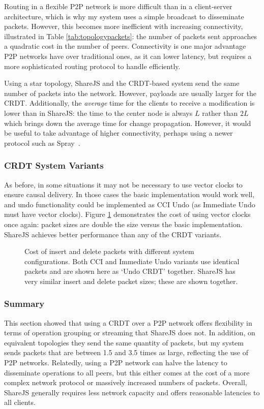 \documentclass[12pt,a4paper,twoside,openright]{report}
\begin{document}
			Routing in a flexible P2P network is more difficult than in a client-server architecture, which is why my system uses a simple broadcast to disseminate packets. However, this becomes more inefficient with increasing connectivity, illustrated in Table \ref{tab:topologypackets}: the number of packets sent approaches a quadratic cost in the number of peers. Connectivity is one major advantage P2P networks have over traditional ones, as it can lower latency, but requires a more sophisticated routing protocol to handle efficiently.
			

			Using a star topology, ShareJS and the CRDT-based system send the same number of packets into the network. However, payloads are usually larger for the CRDT. Additionally, the \textit{average} time for the clients to receive a modification is lower than in ShareJS: the time to the center node is always $L$ rather than $2L$ which brings down the average time for change propagation. However, it would be useful to take advantage of higher connectivity, perhaps using a newer protocol such as Spray~\cite{nedelec2015spray}.
			
			
		\subsubsection{CRDT System Variants}
			As before, in some situations it may not be necessary to use vector clocks to ensure causal delivery. In those cases the basic implementation would work well, and undo functionality could be implemented as CCI Undo (as Immediate Undo must have vector clocks). Figure \ref{fig:sysvariationspackets} demonstrates the cost of using vector clocks once again: packet sizes are double the size versus the basic implementation. ShareJS achieves better performance than any of the CRDT variants.
		
			\begin{figure}[H]
				\centering
				
				\caption[Behavior of System Variants - Packet Size] {Cost of insert and delete packets with different system configurations. Both CCI and Immediate Undo variants use identical packets and are shown here as `Undo CRDT' together. ShareJS has very similar insert and delete packet sizes; these are shown together.}
				\label{fig:sysvariationspackets}
			\end{figure}
			
		
		\subsubsection{Summary}
			This section showed that using a CRDT over a P2P network offers flexibility in terms of operation grouping or streaming that ShareJS does not. In addition, on equivalent topologies they send the same quantity of packets, but my system sends packets that are between 1.5 and 3.5 times as large, reflecting the use of P2P networks. Relatedly, using a P2P network can halve the latency to disseminate operations to all peers, but this either comes at the cost of a more complex network protocol or massively increased numbers of packets. Overall, ShareJS generally requires less network capacity and offers reasonable latencies to all clients.
			
\end{document}
